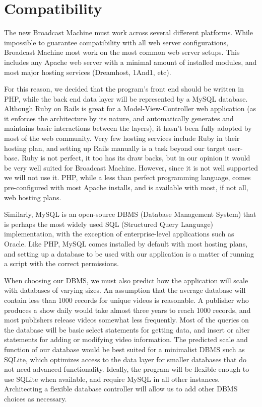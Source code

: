 \documentclass[a4paper,12pt]{report}
\begin{document}
\section{Compatibility}

The new Broadcast Machine must work across several different platforms.
While impossible to guarantee compatibility with all web server configurations, Broadcast Machine most work on the most common web server setups.
This includes any Apache web server with a minimal amount of installed modules, and most major hosting services (Dreamhost, 1And1, etc).

For this reason, we decided that the program’s front end should be written in PHP, while the back end data layer will be represented by a MySQL database. 
Although Ruby on Rails is great for a Model-View-Controller web application (as it enforces the architecture by its nature, and automatically generates and maintains basic interactions between the layers), it hasn’t been fully adopted by most of the web community. 
Very few hosting services include Ruby in their hosting plan, and setting up Rails manually is a task beyond our target user-base. 
Ruby is not perfect, it too has its draw backs, but in our opinion it would be very well suited for Broadcast Machine. 
However, since it is not well supported we will not use it. 
PHP, while a less than perfect programming language, comes pre-configured with most Apache installs, and is available with most, if not all, web hosting plans. 

Similarly, MySQL is an open-source DBMS (Database Management System) that is perhaps the most widely used SQL (Structured Query Language) implementation, with the exception of enterprise-level applications such as Oracle. 
Like PHP, MySQL comes installed by default with most hosting plans, and setting up a database to be used with our application is a matter of running a script with the correct permissions. 

When choosing our DBMS, we must also predict how the application will scale with databases of varying sizes.
An assumption that the average database will contain less than 1000 records for unique videos is reasonable.
A publisher who produces a show daily would take almost three years to reach 1000 records, and most publishers release videos somewhat less frequently.
Most of the queries on the database will be basic select statements for getting data, and insert or alter statements for adding or modifying video information.
The predicted scale and function of our database would be best suited for a minimalist DBMS such as SQLite, which optimizes access to the data layer for smaller databases that do not need advanced functionality.
Ideally, the program will be flexible enough to use SQLite when available, and require MySQL in all other instances.
Architecting a flexible database controller will allow us to add other DBMS choices as necessary. 
\end{document}
